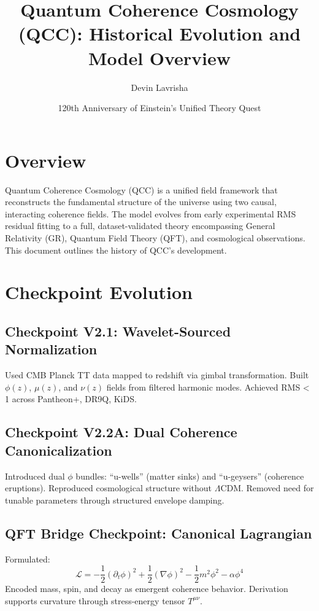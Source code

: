 \documentclass[12pt]{article}
\title{Quantum Coherence Cosmology (QCC): Historical Evolution and Model Overview}
\author{Devin Lavrisha}
\date{120th Anniversary of Einstein's Unified Theory Quest}
\begin{document}
\maketitle

\section*{Overview}
Quantum Coherence Cosmology (QCC) is a unified field framework that reconstructs the fundamental structure of the universe using two causal, interacting coherence fields. The model evolves from early experimental RMS residual fitting to a full, dataset-validated theory encompassing General Relativity (GR), Quantum Field Theory (QFT), and cosmological observations. This document outlines the history of QCC's development.

\section*{Checkpoint Evolution}
\subsection*{Checkpoint V2.1: Wavelet-Sourced Normalization}
Used CMB Planck TT data mapped to redshift via gimbal transformation. Built $\phi(z)$, $\mu(z)$, and $\nu(z)$ fields from filtered harmonic modes. Achieved RMS < 1 across Pantheon+, DR9Q, KiDS.

\subsection*{Checkpoint V2.2A: Dual Coherence Canonicalization}
Introduced dual $\phi$ bundles: ``u-wells'' (matter sinks) and ``u-geysers'' (coherence eruptions). Reproduced cosmological structure without $\Lambda$CDM. Removed need for tunable parameters through structured envelope damping.

\subsection*{QFT Bridge Checkpoint: Canonical Lagrangian}
Formulated:
\[ \mathcal{L} = -\frac{1}{2} (\partial_t \phi)^2 + \frac{1}{2} (\nabla \phi)^2 - \frac{1}{2} m^2 \phi^2 - \alpha \phi^4 \]
Encoded mass, spin, and decay as emergent coherence behavior. Derivation supports curvature through stress-energy tensor $T^{\mu\nu}$.
\end{document}
